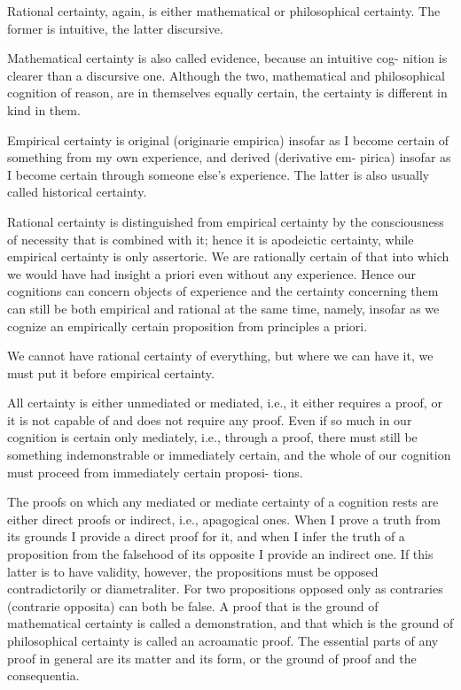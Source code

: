 Rational certainty, again, is either
mathematical or philosophical certainty.
The former is intuitive, the latter discursive.

Mathematical certainty is also called evidence, because an intuitive cog-
nition is clearer than a discursive one. Although the two, mathematical
and philosophical cognition of reason, are in themselves equally certain,
the certainty is different in kind in them.

Empirical certainty is original (originarie empirica) insofar as I become
certain of something from my own experience, and derived (derivative em-
pirica) insofar as I become certain through someone else's experience. The
latter is also usually called historical certainty.

Rational certainty is distinguished from empirical certainty
by the consciousness of necessity that is combined with it;
hence it is apodeictic certainty,
while empirical certainty is only assertoric.
We are rationally certain of that
into which we would have had insight a priori
even without any experience.
Hence our cognitions can concern objects of experience
and the certainty concerning them can still be
both empirical and rational at the same time, namely,
insofar as we cognize an empirically certain proposition
from principles a priori.

We cannot have rational certainty of everything,
but where we can have it,
we must put it before empirical certainty.

All certainty is either unmediated or mediated, i.e., it either requires a
proof, or it is not capable of and does not require any proof. Even if so
much in our cognition is certain only mediately, i.e., through a proof,
there must still be something indemonstrable or immediately certain, and the
whole of our cognition must proceed from immediately certain proposi-
tions.

The proofs on which any mediated or mediate certainty of a cognition
rests are either direct proofs or indirect, i.e., apagogical ones.
When I prove a truth from its grounds I provide a direct proof for it,
and when I infer the truth of a proposition from the falsehood of its
opposite I provide an indirect one.
If this latter is to have validity, however,
the propositions must be opposed contradictorily or diametraliter.
For two propositions opposed only as contraries
(contrarie opposita) can both be false.
A proof that is the ground of mathematical certainty
is called a demonstration,
and that which is the ground of philosophical certainty
is called an acroamatic proof.
The essential parts of any proof in general are
its matter and its form,
or the ground of proof and the consequentia.

